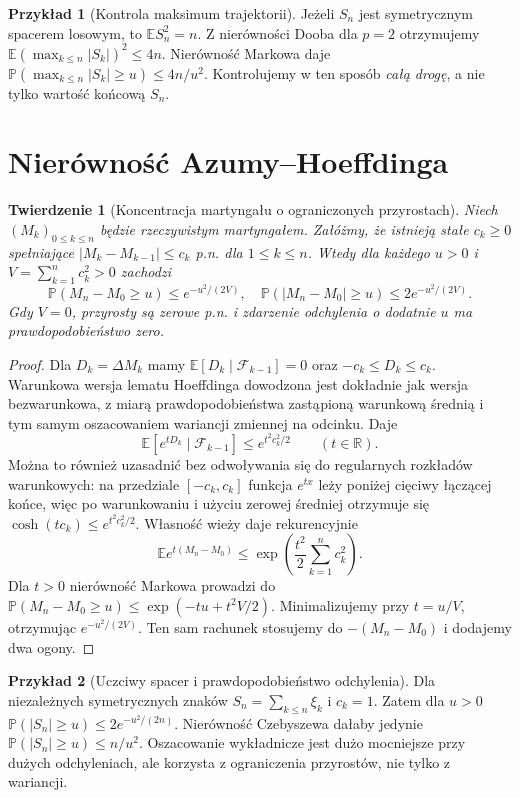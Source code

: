\documentclass[11pt,a4paper,oneside]{report}
\numberwithin{equation}{chapter}
\theoremstyle{plain}
\newtheorem{twierdzenie}{Twierdzenie}[chapter]
\theoremstyle{definition}
\newtheorem{przyklad}{Przykład}[chapter]
\theoremstyle{remark}
\newcommand{\R}{\mathbb{R}}
\newcommand{\Prob}{\mathbb{P}}
\newcommand{\E}{\mathbb{E}}
\begin{document}
\begin{przyklad}[Kontrola maksimum trajektorii]
Jeżeli $S_n$ jest symetrycznym spacerem losowym,
to $\E S_n^2=n$. Z nierówności Dooba dla $p=2$
otrzymujemy
$\E(\max_{k\leq n}|S_k|)^2\leq4n$.
Nierówność Markowa daje
$\Prob(\max_{k\leq n}|S_k|\geq u)\leq4n/u^2$.
Kontrolujemy w ten sposób \emph{całą drogę},
a nie tylko wartość końcową $S_n$.
\end{przyklad}

\section{Nierówność Azumy--Hoeffdinga}

\begin{twierdzenie}[Koncentracja martyngału o ograniczonych przyrostach]
Niech $(M_k)_{0\leq k\leq n}$ będzie rzeczywistym
martyngałem. Załóżmy, że istnieją stałe
$c_k\geq0$ spełniające
$|M_k-M_{k-1}|\leq c_k$ p.n. dla $1\leq k\leq n$.
Wtedy dla każdego $u>0$ i
$V=\sum_{k=1}^n c_k^2>0$ zachodzi
\[
\Prob(M_n-M_0\geq u)\leq e^{-u^2/(2V)},
\quad
\Prob(|M_n-M_0|\geq u)\leq2e^{-u^2/(2V)}.
\]
Gdy $V=0$, przyrosty są zerowe p.n. i zdarzenie
odchylenia o dodatnie $u$ ma prawdopodobieństwo zero.
\end{twierdzenie}
\begin{proof}
Dla $D_k=\Delta M_k$ mamy
$\E[D_k\mid\mathcal F_{k-1}]=0$ oraz
$-c_k\leq D_k\leq c_k$.
Warunkowa wersja lematu Hoeffdinga dowodzona
jest dokładnie jak wersja bezwarunkowa, z
miarą prawdopodobieństwa zastąpioną warunkową
średnią i tym samym oszacowaniem wariancji
zmiennej na odcinku. Daje
\[
\E[e^{tD_k}\mid\mathcal F_{k-1}]
\leq e^{t^2c_k^2/2}\qquad(t\in\R).
\]
Można to również uzasadnić bez odwoływania się
do regularnych rozkładów warunkowych:
na przedziale $[-c_k,c_k]$ funkcja $e^{tx}$
leży poniżej cięciwy łączącej końce,
więc po warunkowaniu i użyciu zerowej średniej
otrzymuje się $\cosh(tc_k)\leq e^{t^2c_k^2/2}$.
Własność wieży daje rekurencyjnie
\[
\E e^{t(M_n-M_0)}\leq
\exp\left(\frac{t^2}{2}\sum_{k=1}^n c_k^2\right).
\]
Dla $t>0$ nierówność Markowa prowadzi do
$\Prob(M_n-M_0\geq u)\leq
\exp(-tu+t^2V/2)$.
Minimalizujemy przy $t=u/V$, otrzymując
$e^{-u^2/(2V)}$. Ten sam rachunek stosujemy do
$-(M_n-M_0)$ i dodajemy dwa ogony.
\end{proof}

\begin{przyklad}[Uczciwy spacer i prawdopodobieństwo odchylenia]
Dla niezależnych symetrycznych znaków
$S_n=\sum_{k\leq n}\xi_k$ i $c_k=1$.
Zatem dla $u>0$
$\Prob(|S_n|\geq u)\leq2e^{-u^2/(2n)}$.
Nierówność Czebyszewa dałaby jedynie
$\Prob(|S_n|\geq u)\leq n/u^2$.
Oszacowanie wykładnicze jest dużo mocniejsze
przy dużych odchyleniach, ale korzysta z ograniczenia
przyrostów, nie tylko z wariancji.
\end{przyklad}
\end{document}
